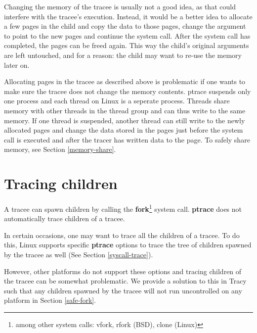 \documentclass[a4paper, 10pt]{report}
\begin{document}
Changing the memory of the tracee is usually not a good idea, as that could
interfere with the tracee's execution.
Instead, it would be a better idea to allocate a few pages in the
child and copy the data to those pages, change the argument to point to the new
pages and continue the system call. After the system call has completed, the
pages can be freed again. This way the child's original arguments are left
untouched, and for a reason: the child may want to re-use the memory later on.

Allocating pages in the tracee as described above is problematic if one wants
to make sure the tracee does not change the memory contents. ptrace suspends
only one process and each thread on Linux is a seperate process. Threads share
memory with other threads in the thread group and can thus write to the same
memory. If one thread is suspended, another thread can still write to the newly
allocated pages and change the data stored in the pages just before the system
call is executed and after the tracer has written data to the page. To safely
share memory, see Section \ref{memory-share}.

\section{Tracing children}

A tracee can spawn children by calling the \textbf{fork}\footnote{among
    other system calls: vfork, rfork (BSD), clone (Linux)} system call. \textbf{ptrace}
does not automatically trace children of a tracee.

In certain occasions, one may want to trace all the children of a tracee.
To do this, Linux supports specific \textbf{ptrace} options to trace
the tree of children spawned by the tracee as well (See Section
\ref{syscall-trace}).

However, other platforms do not support these options and tracing
children of the tracee can be somewhat problematic.
We provide a solution to this in Tracy such that any children
spawned by the tracee will not run uncontrolled on any platform
in Section \ref{safe-fork}.

\end{document}

